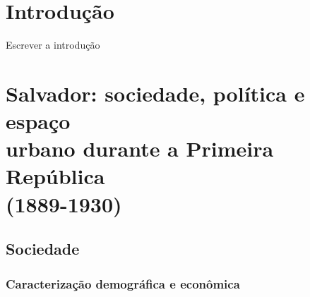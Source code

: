 \documentclass[
	12pt,					%
	openright,			%
	twoside,			%
	a4paper,			%
	english,				%
	french,				%
	spanish,			%
	brazil				%
	]{abntex2}
\begin{document}

%

%

\tableofcontents*
\cleardoublepage



\textual

\chapter*[Introdução]{Introdução}\label{intro}

\lipsum[50]

Escrever a introdução




\chapter[Salvador: sociedade, política e espaço urbano durante a Primeira República (1889-1930)]{Salvador: sociedade, política e espaço\\ urbano durante a Primeira República\\ (1889-1930)}\label{cap:1}

\lipsum[50]

\section[Sociedade]{Sociedade}\label{sec:1.1}
\lipsum[50]
\subsection[Caracterização demográfica e econômica]{Caracterização demográfica e econômica}\label{subsec:1.1.1}
\lipsum[50]
\end{document}
